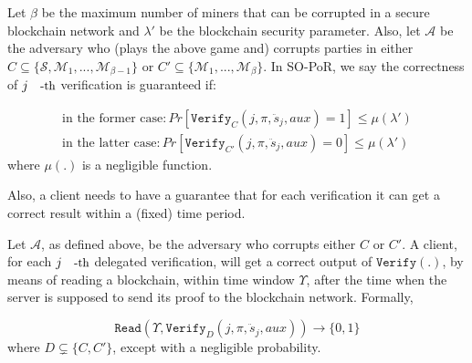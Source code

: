 \begin{definition}\label{Verification-Correctness} Let $\beta$ be the maximum number of miners that can be corrupted in a secure blockchain network and $\lambda'$ be the blockchain security parameter. Also, let $\mathcal{A}$ be the adversary who (plays the above game and) corrupts parties in either $C\subseteq\{\mathcal{S},\mathcal{M}_{\scriptscriptstyle 1},...,\mathcal{M}_{\scriptscriptstyle\beta-1}\}$ or $C'\subseteq\{\mathcal{M}_{\scriptscriptstyle 1},...,\mathcal{M}_{\scriptscriptstyle\beta}\}$.  In SO-PoR, we say the correctness of $j\text{\small-th}$ verification  is guaranteed if: 
 
$$\begin{array}{l}
\text{in the former case}: Pr[\mathtt{Verify}_{\scriptscriptstyle C}(j,\pi,\ddot{s}_{\scriptscriptstyle j},aux)=1]\leq \mu(\lambda')\\
\text{in the latter case}: Pr[\mathtt{Verify}_{\scriptscriptstyle C'}(j,\pi,\ddot{s}_{\scriptscriptstyle j},aux)=0]\leq \mu(\lambda')
\end{array}$$
where $\mu(.)$ is a negligible function. 
\end{definition}

Also, a client needs to have a guarantee that for each verification it can get a correct result within a (fixed) time period. 

\begin{definition}\label{real-time Detection} Let $\mathcal{A}$, as defined above, be the adversary who corrupts either $C$ or $C'$.
A client, for each $j\text{\small{-th}}$ delegated verification, will get a correct output of  $\mathtt{Verify(.)}$, by  means of reading a blockchain, within time window $\Upsilon$, after the time when the server is supposed to send  its proof  to the blockchain network. Formally,

$$\mathtt{Read}(\Upsilon,\mathtt{Verify}_{\scriptscriptstyle D}(j,\pi,\ddot{s}_{\scriptscriptstyle j},aux))\rightarrow \{0,1\}$$
where $D\subsetneq\{C,C'\}$, except with a negligible probability. 
\end{definition}





